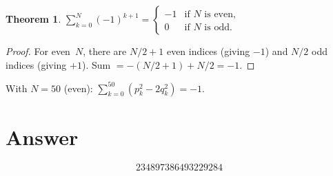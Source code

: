 \documentclass[11pt]{article}
\newtheorem{theorem}{Theorem}
\begin{document}
\begin{theorem}
$\displaystyle\sum_{k=0}^{N} (-1)^{k+1} = \begin{cases} -1 & \text{if $N$ is even,} \\ 0 & \text{if $N$ is odd.}\end{cases}$
\end{theorem}

\begin{proof}
For even~$N$, there are $N/2+1$ even indices (giving $-1$) and $N/2$ odd indices (giving $+1$). Sum $= -(N/2+1) + N/2 = -1$.
\end{proof}

With $N = 50$ (even): $\sum_{k=0}^{50} (p_k^2 - 2q_k^2) = -1$.

\section{Answer}

\[
\boxed{234897386493229284}
\]
\end{document}
